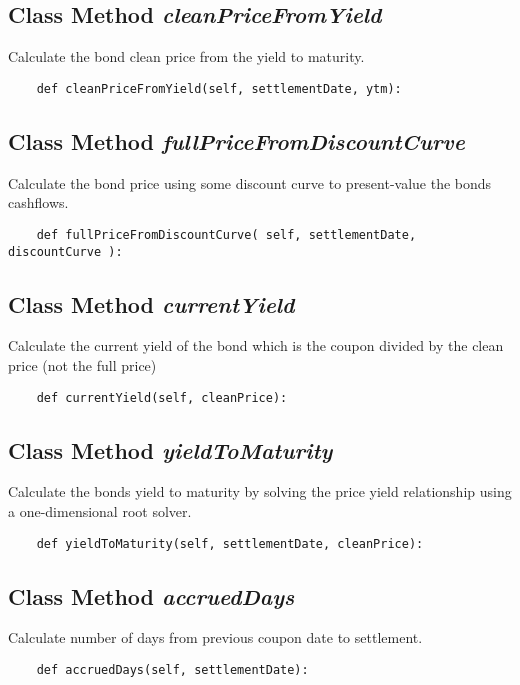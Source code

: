 \documentclass[twoside,11pt]{book}
\begin{document}
\subsection{Class Method {\it cleanPriceFromYield}}
Calculate the bond clean price from the yield to maturity. 

\begin{lstlisting}
    def cleanPriceFromYield(self, settlementDate, ytm):
\end{lstlisting}

\subsection{Class Method {\it fullPriceFromDiscountCurve}}
Calculate the bond price using some discount curve to present-value the bonds cashflows. 

\begin{lstlisting}
    def fullPriceFromDiscountCurve( self, settlementDate, discountCurve ):
\end{lstlisting}

\subsection{Class Method {\it currentYield}}
Calculate the current yield of the bond which is the coupon divided by the clean price (not the full price)

\begin{lstlisting}
    def currentYield(self, cleanPrice):
\end{lstlisting}

\subsection{Class Method {\it yieldToMaturity}}
Calculate the bonds yield to maturity by solving the price yield relationship using a one-dimensional root solver. 

\begin{lstlisting}
    def yieldToMaturity(self, settlementDate, cleanPrice):
\end{lstlisting}

\subsection{Class Method {\it accruedDays}}
Calculate number of days from previous coupon date to settlement.

\begin{lstlisting}
    def accruedDays(self, settlementDate):
\end{lstlisting}
\end{document}
